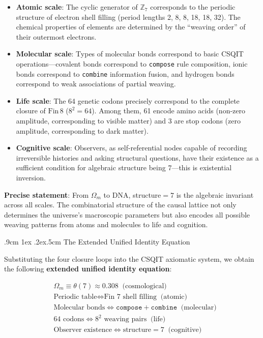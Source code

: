 \documentclass[aps,prd,twocolumn,nofootinbib,floatfix]{revtex4-2}
\makeatletter
\def\subsection{%
  \@startsection{subsection}{2}{\z@}
    {.9cm \@plus1ex \@minus .2ex}{.5cm}
    {\normalfont\normalsize\bfseries\centering}%
}
\makeatother
\begin{document}
\begin{itemize}
    \item \textbf{Atomic scale}: The cyclic generator of $\mathbb{Z}_7$ corresponds to the periodic structure of electron shell filling (period lengths 2, 8, 8, 18, 18, 32). The chemical properties of elements are determined by the ``weaving order'' of their outermost electrons.
    \item \textbf{Molecular scale}: Types of molecular bonds correspond to basic CSQIT operations---covalent bonds correspond to \texttt{compose} rule composition, ionic bonds correspond to \texttt{combine} information fusion, and hydrogen bonds correspond to weak associations of partial weaving.
    \item \textbf{Life scale}: The 64 genetic codons precisely correspond to the complete closure of $\text{Fin}\,8$ ($8^2 = 64$). Among them, 61 encode amino acids (non-zero amplitude, corresponding to visible matter) and 3 are stop codons (zero amplitude, corresponding to dark matter).
    \item \textbf{Cognitive scale}: Observers, as self-referential nodes capable of recording irreversible histories and asking structural questions, have their existence as a sufficient condition for algebraic structure being 7---this is existential inversion.
\end{itemize}

\textbf{Precise statement}: From $\Omega_m$ to DNA, structure$=7$ is the algebraic invariant across all scales. The combinatorial structure of the causal lattice not only determines the universe's macroscopic parameters but also encodes all possible weaving patterns from atoms and molecules to life and cognition.

\subsection{The Extended Unified Identity Equation}

Substituting the four closure loops into the CSQIT axiomatic system, we obtain the following \textbf{extended unified identity equation}:

\[
\boxed{
\begin{aligned}
&\Omega_m \equiv \theta(7) \approx 0.308 \;\; \text{(cosmological)} \\
&\text{Periodic table} \iff \text{Fin 7 shell filling} \;\; \text{(atomic)} \\
&\text{Molecular bonds} \iff \texttt{compose}+\texttt{combine} \;\; \text{(molecular)} \\
&64\text{ codons} \iff 8^2\text{ weaving pairs} \;\; \text{(life)} \\
&\text{Observer existence} \iff \text{structure}=7 \;\; \text{(cognitive)}
\end{aligned}
}
\]
\end{document}
